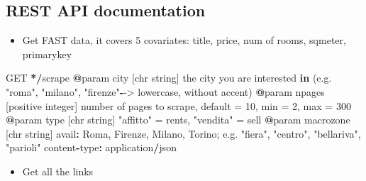 \documentclass[
  12pt,
  a4paper,
  oneside]{book}
\newenvironment{Shaded}{\begin{snugshade}}{\end{snugshade}}
\newcommand{\ControlFlowTok}[1]{\textcolor[rgb]{0.13,0.29,0.53}{\textbf{#1}}}
\newcommand{\DecValTok}[1]{\textcolor[rgb]{0.00,0.00,0.81}{#1}}
\newcommand{\ErrorTok}[1]{\textcolor[rgb]{0.64,0.00,0.00}{\textbf{#1}}}
\newcommand{\NormalTok}[1]{#1}
\newcommand{\OperatorTok}[1]{\textcolor[rgb]{0.81,0.36,0.00}{\textbf{#1}}}
\newcommand{\StringTok}[1]{\textcolor[rgb]{0.31,0.60,0.02}{#1}}
\providecommand{\tightlist}{%
  \setlength{\itemsep}{0pt}\setlength{\parskip}{0pt}}
\begin{document}
\hypertarget{APIdocs}{%
\subsection{REST API documentation}\label{APIdocs}}

\begin{itemize}
\tightlist
\item
  Get FAST data, it covers 5 covariates: title, price, num of rooms, sqmeter, primarykey
\end{itemize}

\begin{Shaded}
\begin{Highlighting}[]
\NormalTok{      GET }\OperatorTok{*}\ErrorTok{/}\NormalTok{scrape}
      \OperatorTok{@}\NormalTok{param city [chr string] the city you are interested }\ControlFlowTok{in}\NormalTok{ (e.g. }\StringTok{"roma"}\NormalTok{, }\StringTok{"milano"}\NormalTok{, }\StringTok{"firenze"}\OperatorTok{-}\NormalTok{->}\StringTok{ }\NormalTok{lowercase, without accent)}
      \OperatorTok{@}\NormalTok{param npages [positive integer] number of pages to scrape, default =}\StringTok{ }\DecValTok{10}\NormalTok{, min  =}\StringTok{ }\DecValTok{2}\NormalTok{, max =}\StringTok{ }\DecValTok{300}
      \OperatorTok{@}\NormalTok{param type [chr string] }\StringTok{"affitto"}\NormalTok{ =}\StringTok{ }\NormalTok{rents, }\StringTok{"vendita"}\NormalTok{  =}\StringTok{ }\NormalTok{sell }
      \OperatorTok{@}\NormalTok{param macrozone [chr string] avail}\OperatorTok{:}\StringTok{ }\NormalTok{Roma, Firenze, Milano, Torino; e.g. }\StringTok{"fiera"}\NormalTok{, }\StringTok{"centro"}\NormalTok{, }\StringTok{"bellariva"}\NormalTok{, }\StringTok{"parioli"} 
\NormalTok{      content}\OperatorTok{-}\NormalTok{type}\OperatorTok{:}\StringTok{ }\NormalTok{application}\OperatorTok{/}\NormalTok{json }
\end{Highlighting}
\end{Shaded}

\begin{itemize}
\tightlist
\item
  Get all the links
\end{itemize}
\end{document}
